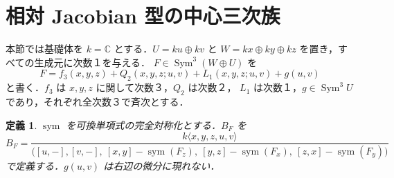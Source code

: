 \documentclass[11pt,a4paper]{ltjsarticle}
\numberwithin{equation}{section}
\newtheorem{definition}[theorem]{定義}
\newcommand{\C}{\mathbb C}
\newcommand{\Sym}{\operatorname{Sym}}
\newcommand{\Symm}{\operatorname{sym}}
\begin{document}
\section{相対 Jacobian 型の中心三次族}\label{sec:construction}
本節では基礎体を $k=\C$ とする．$U=ku\oplus kv$ と
$W=kx\oplus ky\oplus kz$ を置き，すべての生成元に次数１を与える．
$F\in\Sym^3(W\oplus U)$ を
\begin{equation}\label{eq:Ffull}
 F=f_3(x,y,z)+Q_2(x,y,z;u,v)+L_1(x,y,z;u,v)+g(u,v)
\end{equation}
と書く．$f_3$ は $x,y,z$ に関して次数３，$Q_2$ は次数２，
$L_1$ は次数１，$g\in\Sym^3U$ であり，それぞれ全次数３で斉次とする．

\begin{definition}\label{def:B}
$\Symm$ を可換単項式の完全対称化とする．$B_F$ を
\begin{equation}\label{eq:B}
 B_F=\frac{k\langle x,y,z,u,v\rangle}{
 \bigl([u,-],[v,-],\ [x,y]-\Symm(F_z),\
 [y,z]-\Symm(F_x),\ [z,x]-\Symm(F_y)\bigr)}
\end{equation}
で定義する．$g(u,v)$ は右辺の微分に現れない．
\end{definition}
\end{document}
